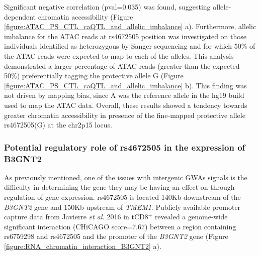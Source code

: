 Significant negative correlation (pval=0.035) was found, suggesting allele-dependent chromatin accessibility (Figure \ref{figure:ATAC_PS_CTL_caQTL_and_allelic_imbalance} a). Furthermore, allelic imbalance for the ATAC reads at rs4672505 position was investigated on those individuals identified as heterozygous by Sanger sequencing and for which 50\% of the ATAC reads were expected to map to each of the alleles. This analysis demonstrated a larger percentage of ATAC reads (greater than the expected 50\%) preferentially tagging the protective allele G (Figure \ref{figure:ATAC_PS_CTL_caQTL_and_allelic_imbalance} b). This finding was not driven by mapping bias, since A was the reference allele in the hg19 build used to map the ATAC data. Overall, these results showed a tendency towards greater chromatin accessibility in presence of the fine-mapped protective allele rs4672505(G) at the chr2p15 locus.
 

\subsubsection{Potential regulatory role of rs4672505 in the expression of B3GNT2}
As previously mentioned, one of the issues with intergenic GWAs signals is the difficulty in determining the gene they may be having an effect on through regulation of gene expression. rs4672505 is located 140Kb downstream of the \textit{B3GNT2} gene and 150Kb upstream of \textit{TMEM1}. Publicly available promoter capture data from Javierre \textit{et al.} 2016 in tCD8$^+$ revealed a genome-wide significant interaction (CHiCAGO score=7.67) between a region containing rs6759298 and rs4672505 and the promoter of the \textit{B3GNT2} gene (Figure \ref{figure:RNA_chromatin_interaction_B3GNT2} a). 

